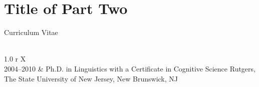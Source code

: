 \documentclass[12pt,oneside]{memoir}	%
\begin{document}
\part{Title of Part Two}
		
		
\makeatletter 
\renewcommand*{\toclevel@chapter}{-1}
\makeatother
%
%
\makeatletter 
\renewcommand*{\toclevel@appendix}{-1}
\makeatother
%
\appendix
% 
% 
%
\backmatter
% 
\SingleSpacing 		%


\adjustmtc								%
\clearpage 
\pagestyle{simple}						
\printindex
\mtcfixindex[chapter]						%

  
\newpage
{}						%
\thispagestyle{simple}					%
\begin{center}
{\Large Curriculum Vitae}\\[9pt]
{\large \theauthor}\\[24pt]
\end{center}


\renewcommand{\arraystretch}{1}
\noindent	\begin{tabularx}{1.0\textwidth}{ r  X }
		\\[6pt]
		2004--2010 	& Ph.D. in Linguistics with a Certificate in Cognitive Science \newline  Rutgers, The State University of New Jersey, New Brunswick, NJ\\[3pt]
		\end{tabularx}
		
		
\end{document}
